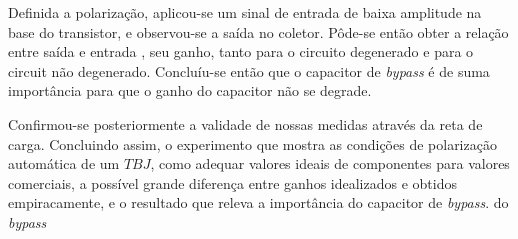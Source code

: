 \documentclass[12pt,a4paper]{article}
\begin{document}
Definida a polarização, aplicou-se um sinal de entrada de  baixa amplitude na
base do transistor, e observou-se a saída no coletor. Pôde-se então obter a 
relação entre  saída e entrada , seu ganho, tanto para o circuito degenerado e 
para o circuit não degenerado. Concluíu-se então que o capacitor de \emph{bypass}
é de suma importância para que o ganho do capacitor não se degrade.

Confirmou-se posteriormente a validade de nossas medidas
através da reta de carga. Concluindo assim, o experimento que mostra 
as condições de polarização automática de um $TBJ$, como adequar valores
ideais de componentes para valores comerciais, a possível grande diferença 
entre ganhos idealizados e obtidos empiracamente,  e o resultado que
releva a importância do capacitor de \emph{bypass}.
do \emph{bypass} 
\end{document}
